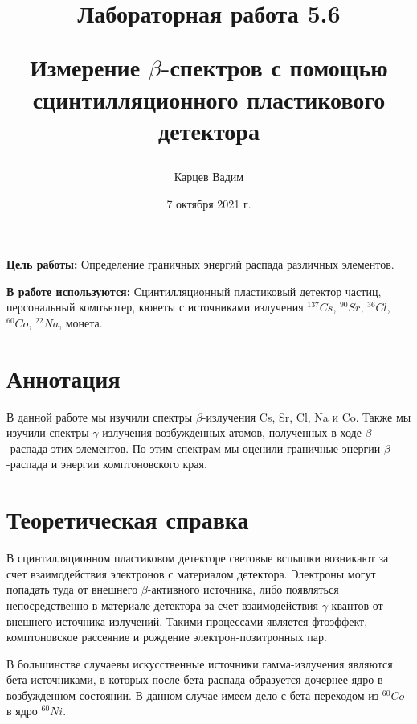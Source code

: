 \documentclass[12pt]{article}
\author{Карцев Вадим}
\date{7 октября 2021 г.}
\title{Лабораторная работа 5.6

Измерение $\beta$-спектров с помощью сцинтилляционного пластикового детектора}
\begin{document}
  \maketitle

  \textbf{Цель работы:} Определение граничных энергий распада различных элементов.

  \textbf{В работе используются:} Сцинтилляционный пластиковый детектор частиц,
  персональный компъютер, кюветы с источниками излучения $^{137}Cs$, $^{90}Sr$,
  $^{36}Cl$, $^{60}Co$, $^{22}Na$, монета.

  \section{Аннотация}

    В данной работе мы изучили спектры $\beta$-излучения Cs, Sr, Cl, Na и Co.
    Также мы изучили спектры $\gamma$-излучения возбужденных атомов, полученных
    в ходе $\beta$-распада этих элементов. По этим спектрам мы оценили граничные
    энергии $\beta$-распада и энергии комптоновского края.

  \newpage
  \section{Теоретическая справка}

    В сцинтилляционном пластиковом детекторе световые вспышки возникают за счет
    взаимодействия электронов с материалом детектора. Электроны могут попадать
    туда от внешнего $\beta$-активного источника, либо появляться
    непосредственно в материале детектора за счет взаимодействия
    $\gamma$-квантов от внешнего источника излучений. Такими процессами является
    фтоэффект, комптоновское рассеяние и рождение электрон-позитронных пар.

    В большинстве случаевы искусственные источники гамма-излучения являются
    бета-источниками, в которых после бета-распада образуется дочернее ядро в
    возбужденном состоянии. В данном случае имеем дело с бета-переходом из
    $^{60} Co$ в ядро $^{60} Ni$.
\end{document}
